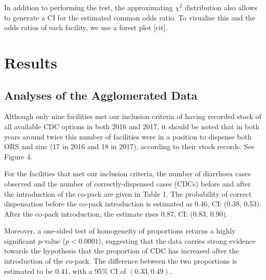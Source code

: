 \documentclass[a4paper, 12pt]{article}
\begin{document}
In addition to performing the test, the approximating $\chi^2$ distribution also allows to generate a CI for the estimated common odds ratio. To visualise this and the odds ratios of each facility, we use a forest plot [cit].





\section{Results}

\subsection{Analyses of the Agglomerated Data}

Although only nine facilities met our inclusion criteria of having recorded stock of all available CDC options in both 2016 and 2017, it should be noted that in both years around twice this number of facilities were in a position to dispense both ORS and zinc (17 in 2016 and 18 in 2017), according to their stock records. See Figure 4.

For the facilities that met our inclusion criteria, the number of diarrhoea cases observed and the number of correctly-dispensed cases (CDCs) before and after the introduction of the co-pack are given in Table 1. The probability of correct dispensation before the co-pack introduction is estimated as 0.46, CI: (0.38, 0.53). After the co-pack introduction, the estimate rises 0.87, CI: (0.83, 0.90). 


Moreover, a one-sided test of homogeneity of proportions returns a highly significant $p$-value ($p<0.0001$), suggesting that the data carries strong evidence towards the hypothesis that the proportion of CDC has increased after the introduction of the co-pack.
The difference between the two proportions is estimated to be $0.41$, with a 95\% CI of $(0.33, 0.49)$.
\end{document}
